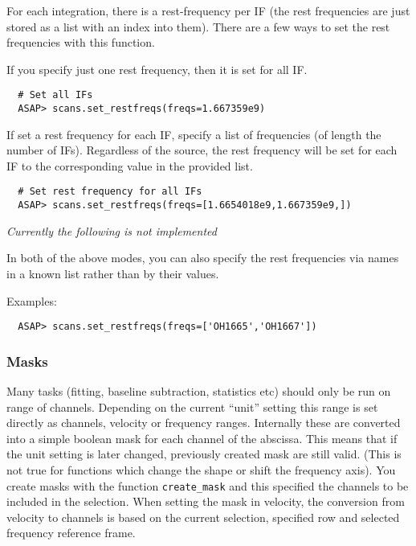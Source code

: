 \documentclass[11pt]{article}
\newcommand{\cmd}[1]{{\tt #1}}
\begin{document}
For each integration, there is a rest-frequency per IF (the rest
frequencies are just stored as a list with an index into them).
There are a few ways to set the rest frequencies with this function.

If you specify just one rest frequency, then it is set for all IF.

\begin{verbatim}
  # Set all IFs
  ASAP> scans.set_restfreqs(freqs=1.667359e9)
\end{verbatim}

If set a rest frequency for each IF, specify a list of frequencies (of
length the number of IFs).  Regardless of the source, the rest
frequency will be set for each IF to the corresponding value in the
provided list.

\begin{verbatim}
  # Set rest frequency for all IFs
  ASAP> scans.set_restfreqs(freqs=[1.6654018e9,1.667359e9,])

\end{verbatim}

{\em Currently the following is not implemented

In both of the above modes, you can also specify the rest frequencies via
names in a known list rather than by their values.

Examples:

\begin{verbatim}
  ASAP> scans.set_restfreqs(freqs=['OH1665','OH1667'])
\end{verbatim}
}

\subsubsection{Masks}


Many tasks (fitting, baseline subtraction, statistics etc) should only
be run on range of channels. Depending on the current ``unit'' setting
this range is set directly as channels, velocity or frequency
ranges. Internally these are converted into a simple boolean mask for
each channel of the abscissa. This means that if the unit setting is
later changed, previously created mask are still valid. (This is not
true for functions which change the shape or shift the frequency
axis).  You create masks with the function \cmd{create\_mask} and this
specified the channels to be included in the selection. When setting
the mask in velocity, the conversion from velocity to channels is
based on the current selection, specified row and selected frequency
reference frame.
\end{document}
